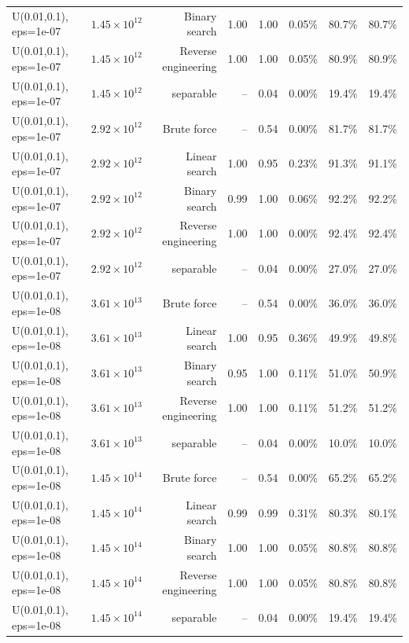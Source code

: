 \begin{tabular}{llrrrrrr}
U(0.01,0.1), eps=1e-07 & $1.45\times 10^{12}$ & Binary search & 1.00 & 1.00 & 0.05\% & 80.7\% & 80.7\% \\
U(0.01,0.1), eps=1e-07 & $1.45\times 10^{12}$ & Reverse engineering & 1.00 & 1.00 & 0.05\% & 80.9\% & 80.9\% \\
U(0.01,0.1), eps=1e-07 & $1.45\times 10^{12}$ & separable & -- & 0.04 & 0.00\% & 19.4\% & 19.4\% \\
U(0.01,0.1), eps=1e-07 & $2.92\times 10^{12}$ & Brute force & -- & 0.54 & 0.00\% & 81.7\% & 81.7\% \\
U(0.01,0.1), eps=1e-07 & $2.92\times 10^{12}$ & Linear search & 1.00 & 0.95 & 0.23\% & 91.3\% & 91.1\% \\
U(0.01,0.1), eps=1e-07 & $2.92\times 10^{12}$ & Binary search & 0.99 & 1.00 & 0.06\% & 92.2\% & 92.2\% \\
U(0.01,0.1), eps=1e-07 & $2.92\times 10^{12}$ & Reverse engineering & 1.00 & 1.00 & 0.00\% & 92.4\% & 92.4\% \\
U(0.01,0.1), eps=1e-07 & $2.92\times 10^{12}$ & separable & -- & 0.04 & 0.00\% & 27.0\% & 27.0\% \\
U(0.01,0.1), eps=1e-08 & $3.61\times 10^{13}$ & Brute force & -- & 0.54 & 0.00\% & 36.0\% & 36.0\% \\
U(0.01,0.1), eps=1e-08 & $3.61\times 10^{13}$ & Linear search & 1.00 & 0.95 & 0.36\% & 49.9\% & 49.8\% \\
U(0.01,0.1), eps=1e-08 & $3.61\times 10^{13}$ & Binary search & 0.95 & 1.00 & 0.11\% & 51.0\% & 50.9\% \\
U(0.01,0.1), eps=1e-08 & $3.61\times 10^{13}$ & Reverse engineering & 1.00 & 1.00 & 0.11\% & 51.2\% & 51.2\% \\
U(0.01,0.1), eps=1e-08 & $3.61\times 10^{13}$ & separable & -- & 0.04 & 0.00\% & 10.0\% & 10.0\% \\
U(0.01,0.1), eps=1e-08 & $1.45\times 10^{14}$ & Brute force & -- & 0.54 & 0.00\% & 65.2\% & 65.2\% \\
U(0.01,0.1), eps=1e-08 & $1.45\times 10^{14}$ & Linear search & 0.99 & 0.99 & 0.31\% & 80.3\% & 80.1\% \\
U(0.01,0.1), eps=1e-08 & $1.45\times 10^{14}$ & Binary search & 1.00 & 1.00 & 0.05\% & 80.8\% & 80.8\% \\
U(0.01,0.1), eps=1e-08 & $1.45\times 10^{14}$ & Reverse engineering & 1.00 & 1.00 & 0.05\% & 80.8\% & 80.8\% \\
U(0.01,0.1), eps=1e-08 & $1.45\times 10^{14}$ & separable & -- & 0.04 & 0.00\% & 19.4\% & 19.4\% \\

\end{tabular}
